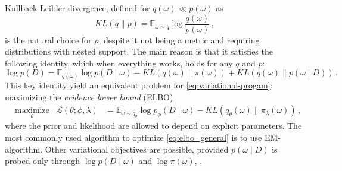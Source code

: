 \documentclass[a4paper,10pt]{article}
\begin{document}
Kullback-Leibler divergence, defined for $q(\omega) \ll p(\omega)$ as
$$
KL(q\| p)
  = \mathbb{E}_{\omega \sim q}
    \log\frac{q(\omega)}{p(\omega)}
  \,, $$
is the natural choice for $\rho$, despite it not being a metric and requiring distributions
with nested support. The main reason is that it satisfies the following identity, which when
everything works, holds for any $q$ and $p$:
\begin{equation} \label{eq:kl-div-master}
  \log p(D)
    = \mathbb{E}_{q(\omega)} \log{p(D \mid \omega)}
    - KL(q(\omega) \| \pi(\omega))
    + KL(q(\omega) \| p(\omega \mid D))
    \,.
\end{equation}
This key identity yield an equivalent problem for \eqref{eq:variational-progam}:
maximizing the \textit{evidence lower bound} (ELBO)
\begin{equation} \label{eq:elbo_general}
\begin{aligned}
  & \underset{\theta}{\text{maximize}}
    & \mathcal{L}(\theta; \phi, \lambda)
      & = \mathbb{E}_{\omega \sim q_{\theta}}
          \log p_{\phi}(D \mid \omega)
        - KL(q_{\theta}(\omega) \| \pi_{\lambda}(\omega))
  \,,
\end{aligned}
\end{equation}
where the prior and likelihood are allowed to depend on explicit parameters. The most
commonly used algorithm to optimize \eqref{eq:elbo_general} is to use EM-algorithm.
Other variational objectives are possible, provided $p(\omega \mid D)$ is probed only
through $\log p(D \mid \omega)$ and $\log \pi(\omega)$, \cite{ranganath_operator_2018}.
\end{document}
